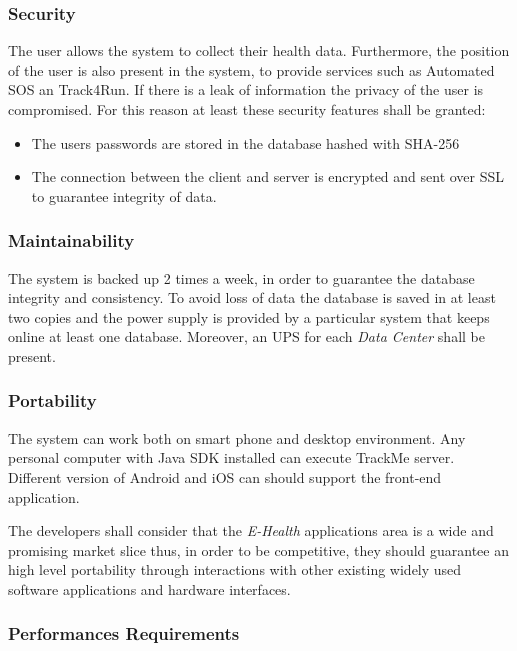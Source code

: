 \documentclass[a4paper]{article}
\begin{document}
        \subsubsection{Security}
        The user allows the system to collect their health data. Furthermore, the position of the user is also present in the system, to provide services such as Automated SOS an Track4Run. If there is a leak of information the privacy of the user is compromised. For this reason at least these security features shall be granted:
       
        \begin{itemize}
        \item         The users passwords are stored in the database hashed with SHA-256\item       The  connection between the client and server is encrypted and sent over SSL to guarantee integrity of data. 
        \end{itemize}
        \subsubsection{Maintainability}

        The system is backed up 2 times a  week, in order to guarantee the database integrity and consistency. To avoid loss of data  the database is saved in at least two copies and the power supply is provided by a particular system that keeps online at least one database. Moreover, an UPS for each \textit{Data Center} shall be present.
        \subsubsection{Portability}

        The system can work both on smart phone and desktop environment. Any personal computer with Java SDK installed can execute TrackMe server. Different version of Android and iOS can should support the front-end application.

        The developers shall consider that the \textit{E-Health} applications area is a wide and promising market slice thus, in order to be competitive, they should guarantee an high level portability through interactions with other existing widely used software applications and hardware interfaces.
        
        \subsubsection{Performances Requirements}
        
\end{document}
